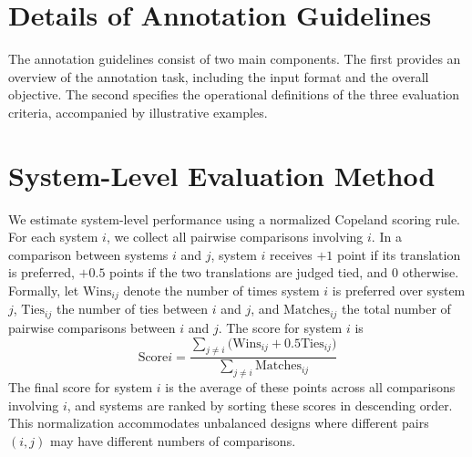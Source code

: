 \documentclass{article}
\theoremstyle{plain}
\theoremstyle{definition}
\theoremstyle{remark}
\begin{document}
\section{Details of Annotation Guidelines}\label{appx:annotation guideline}
The annotation guidelines consist of two main components. 
The first provides an overview of the annotation task, including the input format and the overall objective. 
The second specifies the operational definitions of the three evaluation criteria, accompanied by illustrative examples.

\section{System-Level Evaluation Method}\label{appx:inter-system evaluation}
We estimate system-level performance using a normalized Copeland scoring rule. For each system $i$, we collect all pairwise comparisons involving $i$. In a comparison between systems $i$ and $j$, system $i$ receives $+1$ point if its translation is preferred, $+0.5$ points if the two translations are judged tied, and $0$ otherwise. 
Formally, let $\text{Wins}_{ij}$ denote the number of times system $i$ is preferred over system $j$, $\text{Ties}_{ij}$ the number of ties between $i$ and $j$, and $\text{Matches}_{ij}$ the total number of pairwise comparisons between $i$ and $j$. The score for system $i$ is
\begin{equation}
\text{Score}{i} = \frac{\sum_{j \ne i} \bigl(\text{Wins}_{ij} + 0.5\text{Ties}_{ij}\bigr)}{\sum_{j \ne i} \text{Matches}_{ij}}
\end{equation}
The final score for system $i$ is the average of these points across all comparisons involving $i$, and systems are ranked by sorting these scores in descending order. This normalization accommodates unbalanced designs where different pairs $(i,j)$ may have different numbers of comparisons.
\end{document}
